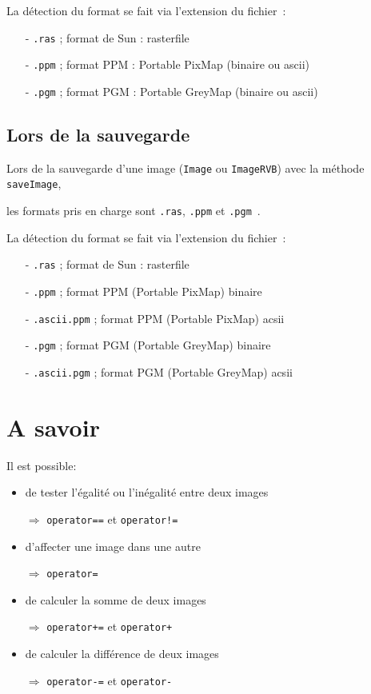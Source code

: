 \documentclass[12pt]{article}
\begin{document}
La d\'etection du format se fait via l'extension du
fichier~:
\begin{itemize}
\item[-] {\tt .ras} ; format de Sun : rasterfile
\item[-] {\tt .ppm} ; format PPM : Portable PixMap (binaire ou ascii)
\item[-] {\tt .pgm} ; format PGM : Portable GreyMap (binaire ou ascii)
\end{itemize}

\subsection{Lors de la sauvegarde}

Lors de la sauvegarde d'une image ({\tt Image} ou {\tt ImageRVB})
avec la m\'ethode {\tt saveImage},

les formats pris en charge sont {\tt .ras}, {\tt .ppm} et {\tt .pgm}~.

La d\'etection du format se fait via l'extension du
fichier~:
\begin{itemize}
\item[-] {\tt .ras} ; format de Sun : rasterfile
\item[-] {\tt .ppm} ; format PPM (Portable PixMap) binaire
\item[-] {\tt .ascii.ppm} ; format PPM (Portable PixMap) acsii
\item[-] {\tt .pgm} ; format PGM (Portable GreyMap) binaire
\item[-] {\tt .ascii.pgm} ; format PGM (Portable GreyMap) acsii
\end{itemize}

\newpage

\section{A savoir}

Il est possible:
\begin{itemize}
\item de tester l'\'egalit\'e ou l'in\'egalit\'e entre deux images

$\Longrightarrow$ {\tt operator==} et {\tt operator!=}

\item d'affecter une image dans une autre

$\Longrightarrow$ {\tt operator=}

\item de calculer la somme de deux images

$\Longrightarrow$ {\tt operator+=} et {\tt operator+}

\item de calculer la diff\'erence de deux images

$\Longrightarrow$ {\tt operator-=} et {\tt operator-}
\end{itemize}
\end{document}
